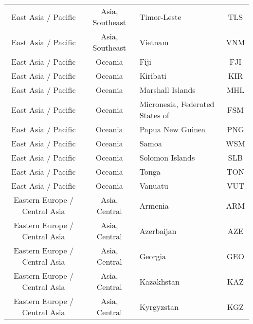 \begin{landscape}
\begin{longtable}{|c|c|p{5cm}|c|}
           East Asia / Pacific &              Asia, Southeast &                                       Timor-Leste &  TLS \\
           East Asia / Pacific &              Asia, Southeast &                                           Vietnam &  VNM \\
           East Asia / Pacific &                      Oceania &                                              Fiji &  FJI \\
           East Asia / Pacific &                      Oceania &                                          Kiribati &  KIR \\
           East Asia / Pacific &                      Oceania &                                  Marshall Islands &  MHL \\
           East Asia / Pacific &                      Oceania &        \raggedright Micronesia, Federated States of &  FSM \\
           East Asia / Pacific &                      Oceania &                                  Papua New Guinea &  PNG \\
           East Asia / Pacific &                      Oceania &                                             Samoa &  WSM \\
           East Asia / Pacific &                      Oceania &                                   Solomon Islands &  SLB \\
           East Asia / Pacific &                      Oceania &                                             Tonga &  TON \\
           East Asia / Pacific &                      Oceania &                                           Vanuatu &  VUT \\
 Eastern Europe / Central Asia &                Asia, Central &                                           Armenia &  ARM \\
 Eastern Europe / Central Asia &                Asia, Central &                                        Azerbaijan &  AZE \\
 Eastern Europe / Central Asia &                Asia, Central &                                           Georgia &  GEO \\
 Eastern Europe / Central Asia &                Asia, Central &                                        Kazakhstan &  KAZ \\
 Eastern Europe / Central Asia &                Asia, Central &                                        Kyrgyzstan &  KGZ \\

\end{longtable}
\end{landscape}
